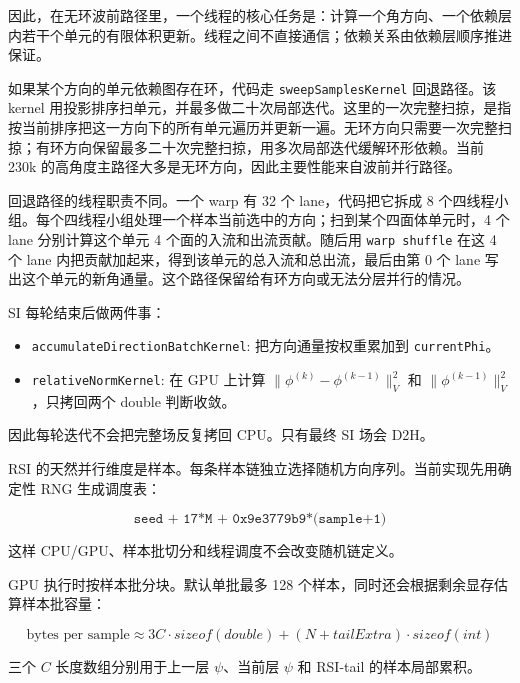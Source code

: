 \documentclass[10pt]{article}
\newcommand{\sect}[1]{\vspace{3mm}{\sffamily\Large\bfseries\color{titleblue} #1}\par\vspace{1mm}{\color{titleblue}\rule{\linewidth}{0.45pt}}\vspace{1mm}}
\newcommand{\subsect}[1]{\vspace{2mm}{\sffamily\large\bfseries #1}\par}
\newcommand{\code}[1]{\texttt{#1}}
\begin{document}
因此，在无环波前路径里，一个线程的核心任务是：计算一个角方向、一个依赖层内若干个单元的有限体积更新。线程之间不直接通信；依赖关系由依赖层顺序推进保证。

\subsect{3.4 有环方向回退路径}

如果某个方向的单元依赖图存在环，代码走 \code{sweepSamplesKernel} 回退路径。该 kernel 用投影排序扫单元，并最多做二十次局部迭代。这里的一次完整扫掠，是指按当前排序把这一方向下的所有单元遍历并更新一遍。无环方向只需要一次完整扫掠；有环方向保留最多二十次完整扫掠，用多次局部迭代缓解环形依赖。当前 230k 的高角度主路径大多是无环方向，因此主要性能来自波前并行路径。

回退路径的线程职责不同。一个 warp 有 32 个 lane，代码把它拆成 8 个四线程小组。每个四线程小组处理一个样本当前选中的方向；扫到某个四面体单元时，4 个 lane 分别计算这个单元 4 个面的入流和出流贡献。随后用 \code{warp shuffle} 在这 4 个 lane 内把贡献加起来，得到该单元的总入流和总出流，最后由第 0 个 lane 写出这个单元的新角通量。这个路径保留给有环方向或无法分层并行的情况。

\subsect{3.5 SI 的归约和收敛判断}

SI 每轮结束后做两件事：

\begin{itemize}
\item \code{accumulateDirectionBatchKernel}: 把方向通量按权重累加到 \code{currentPhi}。
\item \code{relativeNormKernel}: 在 GPU 上计算 $\|\phi^{(k)}-\phi^{(k-1)}\|_V^2$ 和 $\|\phi^{(k-1)}\|_V^2$，只拷回两个 double 判断收敛。
\end{itemize}

因此每轮迭代不会把完整场反复拷回 CPU。只有最终 SI 场会 D2H。

\sect{4. RSI 的 CUDA 并行方式}

\subsect{4.1 样本链并行}

RSI 的天然并行维度是样本。每条样本链独立选择随机方向序列。当前实现先用确定性 RNG 生成调度表：

\[
\code{seed + 17*M + 0x9e3779b9*(sample+1)}
\]

这样 CPU/GPU、样本批切分和线程调度不会改变随机链定义。

GPU 执行时按样本批分块。默认单批最多 128 个样本，同时还会根据剩余显存估算样本批容量：

\[
\text{bytes per sample} \approx 3C \cdot sizeof(double) + (N+tailExtra)\cdot sizeof(int)
\]

三个 $C$ 长度数组分别用于上一层 $\psi$、当前层 $\psi$ 和 RSI-tail 的样本局部累积。
\end{document}
